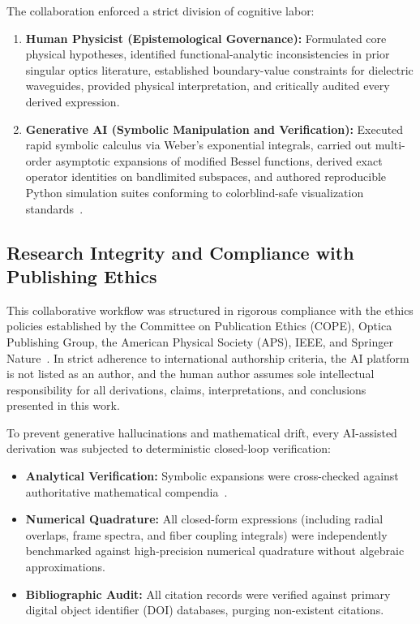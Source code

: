 \documentclass[11pt,a4paper]{article}
\begin{document}
The collaboration enforced a strict division of cognitive labor:
\begin{enumerate}
    \item \textbf{Human Physicist (Epistemological Governance):} Formulated core physical hypotheses, identified functional-analytic inconsistencies in prior singular optics literature, established boundary-value constraints for dielectric waveguides, provided physical interpretation, and critically audited every derived expression.
    \item \textbf{Generative AI (Symbolic Manipulation and Verification):} Executed rapid symbolic calculus via Weber's exponential integrals, carried out multi-order asymptotic expansions of modified Bessel functions, derived exact operator identities on bandlimited subspaces, and authored reproducible Python simulation suites conforming to colorblind-safe visualization standards~\cite{Zhu2026PaperBanana}.
\end{enumerate}

\subsection{Research Integrity and Compliance with Publishing Ethics}
This collaborative workflow was structured in rigorous compliance with the ethics policies established by the Committee on Publication Ethics (COPE), Optica Publishing Group, the American Physical Society (APS), IEEE, and Springer Nature~\cite{Jauhiainen2026,Haber2025,OToole2024,Kacena2024}. In strict adherence to international authorship criteria, the AI platform is not listed as an author, and the human author assumes sole intellectual responsibility for all derivations, claims, interpretations, and conclusions presented in this work.

To prevent generative hallucinations and mathematical drift, every AI-assisted derivation was subjected to deterministic closed-loop verification:
\begin{itemize}
    \item \textbf{Analytical Verification:} Symbolic expansions were cross-checked against authoritative mathematical compendia~\cite{Gradshteyn2014,Arfken2012}.
    \item \textbf{Numerical Quadrature:} All closed-form expressions (including radial overlaps, frame spectra, and fiber coupling integrals) were independently benchmarked against high-precision numerical quadrature without algebraic approximations.
    \item \textbf{Bibliographic Audit:} All citation records were verified against primary digital object identifier (DOI) databases, purging non-existent citations.
\end{itemize}
\end{document}
